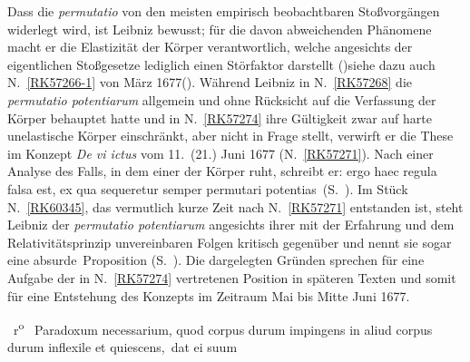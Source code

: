 \begin{ledgroup}
%
Dass die \textit{permutatio} von den meisten empirisch beobachtbaren Stoßvorgängen widerlegt wird, 
%
ist Leibniz bewusst; für die davon abweichenden Phänomene macht er die Elastizität der Körper
%
verantwortlich, welche angesichts der eigentlichen Stoßgesetze lediglich einen Störfaktor darstellt 
%
(\protect\vphantom)siehe dazu auch N.~\ref{RK57266-1} von März 1677\protect\vphantom().
%
Während Leibniz  in N.~\ref{RK57268} die \textit{permutatio potentiarum} allgemein und
%
ohne Rücksicht auf die Verfassung der Körper behauptet hatte
%
und in N.~\ref{RK57274} ihre Gültigkeit zwar auf harte unelastische Körper einschränkt, aber nicht in Frage stellt,
%
verwirft er die These im Konzept \textit{De vi ictus} vom 11.\ (21.) Juni 1677 (N.~\ref{RK57271}). 
%
Nach einer Analyse des Falls, in dem einer der Körper ruht, schreibt er:
%
\glqq ergo haec regula falsa est, ex qua sequeretur semper permutari potentias\grqq\ (S.~).
%
Im Stück N.~\ref{RK60345}, das vermutlich kurze Zeit nach N.~\ref{RK57271} entstanden ist,
%
steht Leibniz der \textit{permutatio potentiarum} angesichts ihrer mit der Erfahrung und dem Relativitätsprinzip unvereinbaren Folgen kritisch gegenüber und nennt sie sogar eine \glqq absurde\grqq\  Proposition (S.~).
%
%
Die dargelegten Gründen sprechen für eine Aufgabe der in N.~\ref{RK57274} vertretenen Position in späteren Texten und somit für eine Entstehung des Konzepts im Zeitraum Mai bis Mitte Juni 1677.
\pend
%
\end{ledgroup}
%
\frenchspacing
%
\vspace{8mm}
\count{}%
\count{}%
\count{}
\pstart%
\normalsize%
\noindent%
~r\textsuperscript{o}\rbrack\ %
%
Paradoxum necessarium, quod corpus durum\protect{} impingens in 
aliud corpus durum inflexile\protect{} 
%
et quiescens\lbrack,\rbrack\ dat ei suum 
%
%
